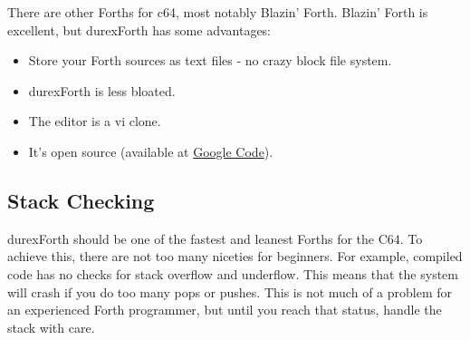 There are other Forths for c64, most notably Blazin' Forth. Blazin' Forth is excellent, but durexForth has some advantages:

\begin{itemize}
\item Store your Forth sources as text files - no crazy block file system.
\item durexForth is less bloated.
\item The editor is a vi clone.
\item It's open source (available at \href{http://code.google.com/p/durexforth/}{Google Code}).
\end{itemize}


\subsection{Stack Checking}

durexForth should be one of the fastest and leanest Forths for the C64. To achieve this, there are
not too many niceties for beginners. For example, compiled code has no checks for stack overflow
and underflow. This means that the system will crash if you do too many pops or pushes. This is not much of a problem for an experienced Forth programmer, but until you reach that status, handle the stack with care.
